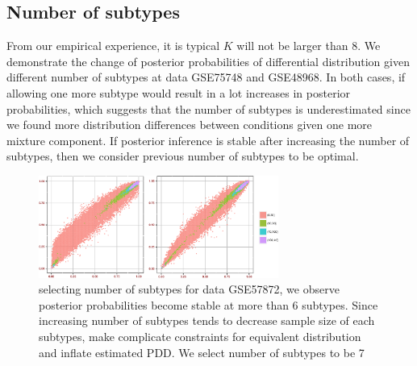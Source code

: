 \documentclass[11pt]{amsart}
\begin{document}
\subsection{Number of subtypes}
From our empirical experience, it is typical $K$ will not be larger than 8. We demonstrate the change of posterior probabilities of differential distribution given different number of subtypes at data GSE75748 and GSE48968. In both cases, if allowing one more subtype would result in a lot increases in posterior probabilities, which suggests that the number of subtypes is underestimated since we found more distribution differences between conditions given one more mixture component. If posterior inference is stable after increasing the number of subtypes, then we consider previous number of subtypes to be optimal. 
\begin{figure}[H]

\includegraphics[width = 0.7\textwidth]{Figs/s_78_GSE57872.pdf}

\caption{selecting number of subtypes for data GSE57872, we observe posterior probabilities become stable at more than 6 subtypes. Since increasing number of subtypes tends to decrease sample size of each subtypes, make complicate constraints for equivalent distribution and inflate estimated PDD.  We select number of subtypes to be 7}
\end{figure}
\end{document}
